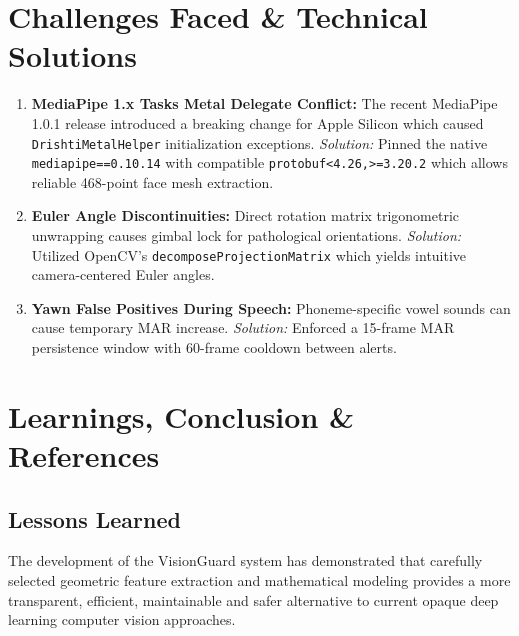 \documentclass[11pt,a4paper]{article}
\begin{document}
\section{Challenges Faced \& Technical Solutions}
\begin{enumerate}
    \item \textbf{MediaPipe 1.x Tasks Metal Delegate Conflict:} The recent MediaPipe 1.0.1 release introduced a breaking change for Apple Silicon which caused \texttt{DrishtiMetalHelper} initialization exceptions.
    \textit{Solution:} Pinned the native \texttt{mediapipe==0.10.14} with compatible \texttt{protobuf<4.26,>=3.20.2} which allows reliable 468-point face mesh extraction.
    \item \textbf{Euler Angle Discontinuities:} Direct rotation matrix trigonometric unwrapping causes gimbal lock for pathological orientations.
    \textit{Solution:} Utilized OpenCV's \texttt{decomposeProjectionMatrix} which yields intuitive camera-centered Euler angles.
    \item \textbf{Yawn False Positives During Speech:} Phoneme-specific vowel sounds can cause temporary MAR increase.
    \textit{Solution:} Enforced a 15-frame MAR persistence window with 60-frame cooldown between alerts.
\end{enumerate}

\section{Learnings, Conclusion \& References}
\subsection{Lessons Learned}
The development of the VisionGuard system has demonstrated that carefully selected geometric feature extraction and mathematical modeling provides a more transparent, efficient, maintainable and safer alternative to current opaque deep learning computer vision approaches.
\end{document}
